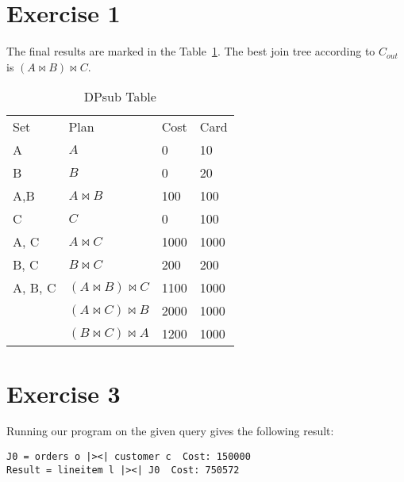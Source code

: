 \documentclass{scrartcl}
\newcommand{\join}{\Join}
\begin{document}
\section*{Exercise 1}

The final results are marked in the Table~\ref{exercise1}. The best join tree according to
$C_{out}$ is $(A \join B) \join C$.

\begin{table}[]
\centering
\caption{DPsub Table}
\label{exercise1}
\begin{tabular}{@{}llll@{}}
\rowcolor[HTML]{F8A102}
Set & Plan & Cost & Card \\
A & $A$ & 0 & 10 \\
B & $B$ & 0 & 20 \\
A,B & $A \join B$ & 100 & 100 \\
C & $C$ & 0 & 100 \\
A, C & $A \join C$ & 1000 & 1000 \\
B, C & $B \join C$ & 200 & 200 \\
\rowcolor[HTML]{FFCC67}
A, B, C & $(A \join B) \join C$ & 1100 & 1000 \\
\rowcolor[HTML]{FFCC67}
 & $(A \join C) \join B$ & 2000 & 1000 \\
\rowcolor[HTML]{FFCC67}
 & $(B \join C) \join A$ & 1200 & 1000 \\
\end{tabular}
\end{table}

\section*{Exercise 3}

Running our program on the given query gives the following result:
\begin{lstlisting}
J0 = orders o |><| customer c  Cost: 150000
Result = lineitem l |><| J0  Cost: 750572
\end{lstlisting}
\end{document}
